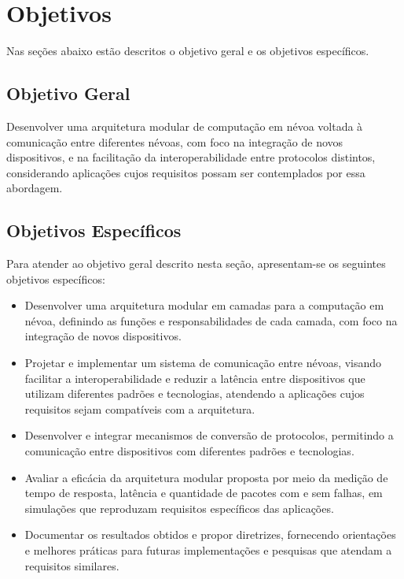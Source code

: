 \section{Objetivos}

Nas seções abaixo estão descritos o objetivo geral e os objetivos 
específicos.

\subsection{Objetivo Geral}

Desenvolver uma arquitetura modular de computação em névoa voltada à comunicação entre diferentes névoas, com foco na integração de novos dispositivos, e na facilitação da interoperabilidade entre protocolos distintos, considerando aplicações cujos requisitos possam ser contemplados por essa abordagem.

\subsection{Objetivos Específicos}

Para atender ao objetivo geral descrito nesta seção, apresentam-se os seguintes objetivos específicos:

\begin{itemize}
  \item Desenvolver uma arquitetura modular em camadas para a computação em névoa, definindo as funções e responsabilidades de cada camada, com foco na integração de novos dispositivos.
  
  \item Projetar e implementar um sistema de comunicação entre névoas, visando facilitar a interoperabilidade e reduzir a latência entre dispositivos que utilizam diferentes padrões e tecnologias, atendendo a aplicações cujos requisitos sejam compatíveis com a arquitetura.

  \item Desenvolver e integrar mecanismos de conversão de protocolos, permitindo a comunicação entre dispositivos com diferentes padrões e tecnologias.

  \item Avaliar a eficácia da arquitetura modular proposta por meio da medição de tempo de resposta, latência e quantidade de pacotes com e sem falhas, em simulações que reproduzam requisitos específicos das aplicações.

  \item Documentar os resultados obtidos e propor diretrizes, fornecendo orientações e melhores práticas para futuras implementações e pesquisas que atendam a requisitos similares.
\end{itemize}
